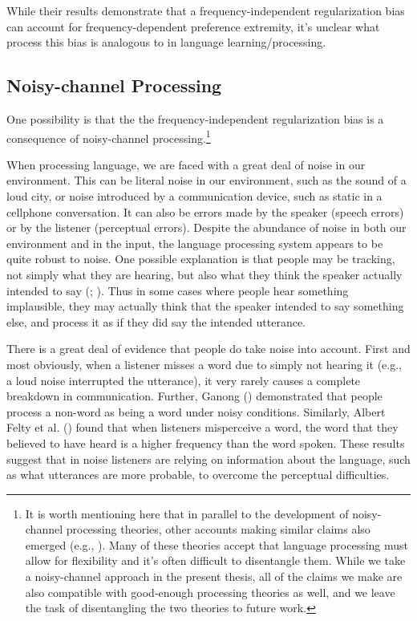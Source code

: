\documentclass[
  12pt,
]{scrartcl}
\begin{document}
While their results demonstrate that a frequency-independent
regularization bias can account for frequency-dependent preference
extremity, it's unclear what process this bias is analogous to in
language learning/processing.

\subsection{Noisy-channel Processing}\label{noisy-channel-processing}

One possibility is that the the frequency-independent regularization
bias is a consequence of noisy-channel processing.\footnote{It is worth
  mentioning here that in parallel to the development of noisy-channel
  processing theories, other accounts making similar claims also emerged
  (e.g., ). Many of these theories accept that language processing
  must allow for flexibility and it's often difficult to disentangle
  them. While we take a noisy-channel approach in the present thesis,
  all of the claims we make are also compatible with good-enough
  processing theories as well, and we leave the task of disentangling
  the two theories to future work.}

When processing language, we are faced with a great deal of noise in our
environment. This can be literal noise in our environment, such as the
sound of a loud city, or noise introduced by a communication device,
such as static in a cellphone conversation. It can also be errors made
by the speaker (speech errors) or by the listener (perceptual errors).
Despite the abundance of noise in both our environment and in the input,
the language processing system appears to be quite robust to noise. One
possible explanation is that people may be tracking, not simply what
they are hearing, but also what they think the speaker actually intended
to say
(; ).
Thus in some cases where people hear something implausible, they may
actually think that the speaker intended to say something else, and
process it as if they did say the intended utterance.

There is a great deal of evidence that people do take noise into
account. First and most obviously, when a listener misses a word due to
simply not hearing it (e.g., a loud noise interrupted the utterance), it
very rarely causes a complete breakdown in communication. Further,
Ganong ()
demonstrated that people process a non-word as being a word under noisy
conditions. Similarly, Albert Felty et al.
() found that when
listeners misperceive a word, the word that they believed to have heard
is a higher frequency than the word spoken. These results suggest that
in noise listeners are relying on information about the language, such
as what utterances are more probable, to overcome the perceptual
difficulties.
\end{document}
